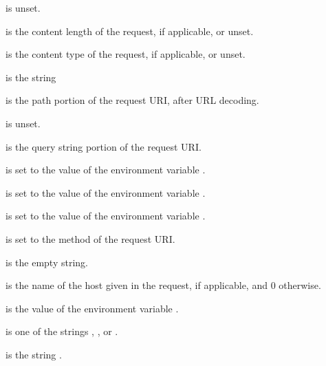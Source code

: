 \documentclass{book}
\begin{document}
 is unset.

 is the content length of the request, if
applicable, or unset.

 is the content type of the request, if
applicable, or unset.

 is the string 

 is the path portion of the request URI, after URL
decoding.

 is unset.

 is the query string portion of the request URI.

 is set to the value of the environment variable .

 is set to the value of the environment variable .

 is set to the value of the environment variable .

 is set to the method of the request URI.

 is the empty string.

 is the name of the host given in the request, if
applicable, and 0 otherwise.

 is the value of the environment variable .

 is one of the strings ,
, or .

 is the string .
\end{document}
